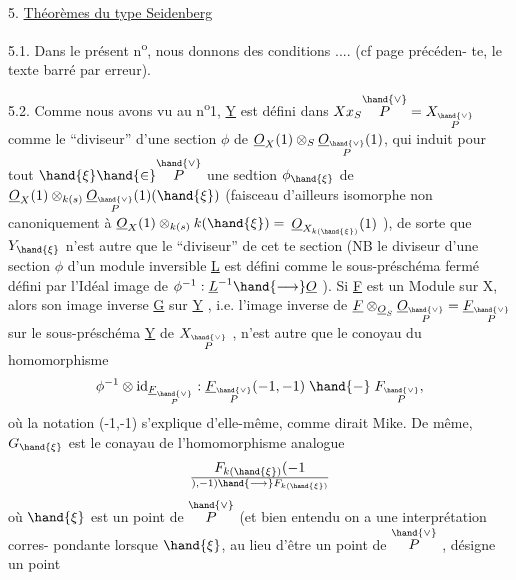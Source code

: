 
5. \uline{Th\'eor\`emes du type Seidenberg}

5.1.
Dans le pr\'esent n\textsuperscript{o}, nous donnons des conditions .... (cf page pr\'ec\'eden-%
te, le texte barr\'e par erreur).

5.2. Comme nous avons vu au n\textsuperscript{o}1, \underline{Y} est d\'efini dans $X x_S \overset{\hand{\vee}}{P} = X_{\overset{\hand{\vee}}{P}}$
comme le ``diviseur'' d'une section $\phi$ de $\underline{O}_X(1)\otimes_S \underline{O}_{\overset{\hand{\vee}}{P}}(1)$, qui induit pour
tout $\hand{\xi} \hand{\in} \overset{\hand{\vee}}{P}$ une sedtion $\phi_{\hand{\xi}}$ de  $\underline{O}_X(1)\otimes_{k(s)}\underline{O}_{\overset{\hand{\vee}}{P}}(1)(\hand{\xi})$
(faisceau d'ailleurs isomorphe non canoniquement \`a $\underline{O}_X(1)\otimes_{k(s)}k(\hand{\xi}) =$
$\underline{O}_{X_{k(\hand{\xi})}}(1)$ ), de sorte que $Y_{\hand{\xi}}$ n'est autre que le  ``diviseur'' de cet
te section (NB le diviseur d'une section $\phi$ d'un module inversible \underline{L} \margin{$/\!/$}
est d\'efini comme le sous-pr\'esch\'ema ferm\'e d\'efini par l'Id\'eal image de
$\phi^{-1} : \underline{L}^{-1} \hand{\longrightarrow} \underline{O}$ ). Si \underline{F} est un Module sur X, alors son image inverse \underline{G}
sur \underline{Y} , i.e. l'image inverse de $\underline{F}\otimes_{\underline{O}_S}\underline{O}_{\overset{\hand{\vee}}{P}} = \underline{F}_{\overset{\hand{\vee}}{P}}$ sur le sous-pr\'esch\'ema \underline{Y} de
$X_{\overset{\hand{\vee}}{P}}$ , n'est autre que le conoyau du homomorphisme
\[ \phi^{-1}\otimes \mathrm{id}_{\underline{F}_{\overset{\hand{\vee}}{P}}} : \underline{F}_{\overset{\hand{\vee}}{P}}(-1,-1) \mathrel{\hand{-}} F_{\overset{\hand{\vee}}{P}} , \]
o\`u la notation (-1,-1) s'explique d'elle-m\^eme, comme dirait Mike. De
m\^eme, $G_{\hand{\xi}}$ est le conayau de l'homomorphisme analogue
\[ F_{k(\hand{\xi})}(-1\over{)}{,}-1) \hand{\longrightarrow} F_{k(\hand{\xi})} \]
o\`u $\hand{\xi}$ est un point de $\overset{\hand{\vee}}{P}$ (et bien entendu on a une interpr\'etation corres-%
pondante lorsque $\hand{\xi}$, au lieu d'\^etre un point de $\overset{\hand{\vee}}{P}$ , d\'esigne un point
